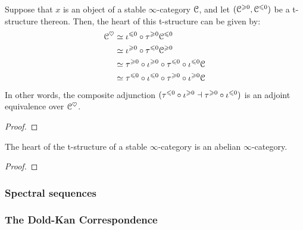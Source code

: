             \begin{corollary} \label{coro: short_exact_sequences_and_truncations}
                Suppose that $x$ is an object of a stable $\infty$-category $\mathcal{C}$, and let $(\mathcal{C}^{\geqslant 0}, \mathcal{C}^{\leqslant 0})$ be a t-structure thereon. Then, the heart of this t-structure can be given by:
                    $$
                        \begin{aligned}
                            \mathcal{C}^{\heartsuit} & \simeq \iota^{\leqslant 0} \circ \tau^{\geqslant 0} \mathcal{C}^{\leqslant 0}
                            \\
                            & \simeq \iota^{\geqslant 0} \circ \tau^{\leqslant 0} \mathcal{C}^{\geqslant 0} 
                            \\
                            & \simeq \tau^{\geqslant 0} \circ \iota^{\geqslant 0} \circ \tau^{\leqslant 0} \circ \iota^{\leqslant 0} \mathcal{C} 
                            \\
                            & \simeq \tau^{\leqslant 0} \circ \iota^{\leqslant 0} \circ \tau^{\geqslant 0} \circ \iota^{\geqslant 0} \mathcal{C}
                        \end{aligned}
                    $$
                In other words, the composite adjunction $(\tau^{\leqslant 0} \circ \iota^{\geqslant 0} \dashv \tau^{\geqslant 0} \circ \iota^{\leqslant 0})$ is an adjoint equivalence over $\mathcal{C}^{\heartsuit}$. 
            \end{corollary}
                \begin{proof}
                    
                \end{proof}
            
            \begin{theorem} \label{theorem: hearts_are_abelian} 
                The heart of the t-structure of a stable $\infty$-category is an abelian $\infty$-category.
            \end{theorem}
                \begin{proof}
                    
                \end{proof}
                
        \subsubsection{Spectral sequences}
        
        \subsubsection{The Dold-Kan Correspondence}
        
